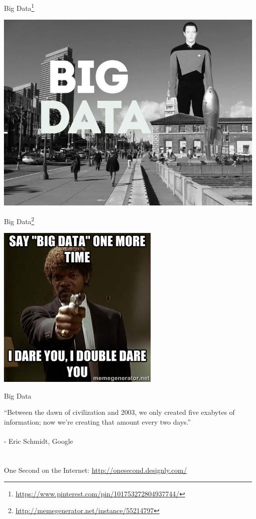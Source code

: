 \documentclass{beamer}
\begin{document}
\begin{frame}{Big Data\footnote{\url{https://www.pinterest.com/pin/101753272804937744/}}}
    \begin{center}
        \includegraphics[scale=0.38]{bigDataStarTrek.jpg}
    \end{center}
\end{frame}

\begin{frame}{Big Data\footnote{\url{http://memegenerator.net/instance/55214797}}}
    \begin{center}
        \includegraphics[scale=0.8]{bigDataPulpFiction.jpg}
    \end{center}
\end{frame}

\begin{frame}{Big Data}
    \begin{center}
        {\Large``Between the dawn of civilization and 2003, we only created five exabytes of information; now we're creating that amount every two days.'' \\ 
        ~\\ \qquad \qquad - Eric Schmidt, Google} \\ 
        ~\\~\\
        One Second on the Internet: \url{http://onesecond.designly.com/}
    \end{center}
\end{frame}
\end{document}
